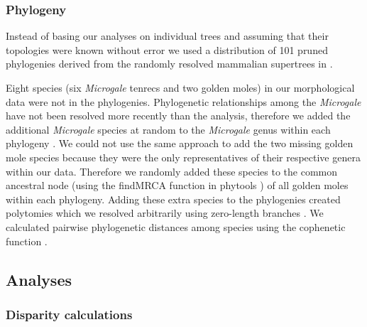 \documentclass[12pt,a4paper]{article}
\begin{document}
\subsubsection{Phylogeny} 
Instead of basing our analyses on individual trees and assuming that their topologies were known without error \citep[e.g.][]{Ruta2013, Foth2012, Brusatte2008, Harmon2003} we used a distribution of 101 pruned phylogenies derived from the randomly resolved mammalian supertrees in \citep{Kuhn2011}. 

Eight species (six \textit{Microgale} tenrecs and two golden moles) in our morphological data were not in the phylogenies. Phylogenetic relationships among the \textit{Microgale} have not been resolved more recently than the \citep{Kuhn2011} analysis, therefore we added the additional \textit{Microgale} species at random to the \textit{Microgale} genus within each phylogeny \citep{Revell2012}. We could not use the same approach to add the two missing golden mole species because they were the only representatives of their respective genera within our data. Therefore we randomly added these species to the common ancestral node (using the findMRCA function in phytools \citep{Revell2012}) of all golden moles within each phylogeny. Adding these extra species to the phylogenies created polytomies which we resolved arbitrarily using zero-length branches \citep{Paradis2004}. We calculated pairwise phylogenetic distances among species using the cophenetic function \citep[R Development Core][]{Team2013}. 
	
\subsection{Analyses}
\subsubsection{Disparity calculations} 
\end{document}
